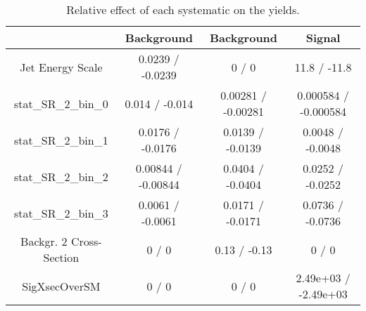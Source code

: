 \documentclass[10pt]{article}
\begin{document}
\begin{table}[htbp]
\begin{center}
\begin{tabular}{|c|c|c|c|}
\hline 
      & Background      & Background      & Signal \\ 
\hline 
  Jet Energy Scale & 0.0239 / -0.0239 & 0 / 0 & 11.8 / -11.8 \\ 
 stat_SR_2_bin_0 & 0.014 / -0.014 & 0.00281 / -0.00281 & 0.000584 / -0.000584 \\ 
 stat_SR_2_bin_1 & 0.0176 / -0.0176 & 0.0139 / -0.0139 & 0.0048 / -0.0048 \\ 
 stat_SR_2_bin_2 & 0.00844 / -0.00844 & 0.0404 / -0.0404 & 0.0252 / -0.0252 \\ 
 stat_SR_2_bin_3 & 0.0061 / -0.0061 & 0.0171 / -0.0171 & 0.0736 / -0.0736 \\ 
  Backgr. 2 Cross-Section & 0 / 0 & 0.13 / -0.13 & 0 / 0 \\ 
 SigXsecOverSM & 0 / 0 & 0 / 0 & 2.49e+03 / -2.49e+03 \\ 
\hline 
\end{tabular} 
\caption{Relative effect of each systematic on the yields.} 
\end{center} 
\end{table} 
\end{document}
